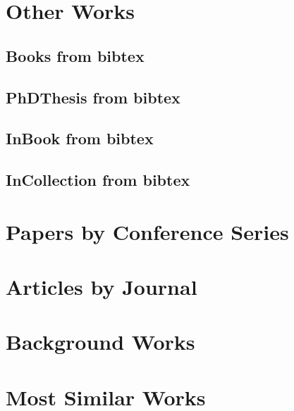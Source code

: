 \documentclass[a4paper]{article}
\begin{document}


\clearpage
\section{Other Works}

\clearpage
\subsection{Books from bibtex}


\clearpage
\subsection{PhDThesis from bibtex}


\clearpage



\clearpage
\subsection{InBook from bibtex}


\clearpage
\subsection{InCollection from bibtex}


\clearpage


\clearpage
\section{Papers by Conference Series}



\clearpage
\section{Articles by Journal}



\clearpage
\section{Background Works}



\clearpage
\section{Most Similar Works}
\end{document}
